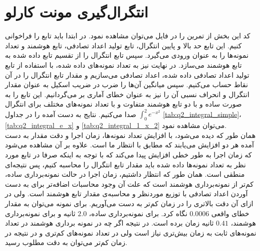 \documentclass[11pt, a4paper]{article}
\begin{document}
\section{\textbf{انتگرال‌گیری مونت کارلو}}
کد این بخش از تمرین را در فایل
می‌توان مشاهده نمود.
در ابتدا باید تابع
را فراخوانی کنیم.
این تابع حد بالا و پایین انتگرال، تابع تولید اعداد تصادفی،
تابع هوشمند و تعداد نمونه‌ها را به عنوان ورودی می‌گیرد.
سپس تابع انتگرال را از تقسیم تابع داده شده به تابع هوشمند می‌سازد.
در نهایت نیز به تعداد نمونه‌های داده شده، با استفاده از تابع تولید اعداد تصادفی داده شده، اعداد تصادفی می‌سازیم و
مقدار تابع انتگرال را در آن نقاط حساب می‌کنیم.
سپس میانگین آن‌ها را ضرب در ضریب اسکیل به عنوان مقدار انتگرال و انحراف نسبی آن را نیز به عنوان خطای آماری بر می‌گردانیم.
این تابع را به صورت ساده و با دو تابع هوشمند متفاوت و با تعداد نمونه‌های مختلف  برای انتگرال 
$\int_0^2 e^{-x^2}$
صدا می‌کنیم.
نتایج به دست آمده را در جداول
\ref{tab:q2_integral_simple}،
\ref{tab:q2_integral_e_x}
و
\ref{tab:q2_integral_1_x_2}
می‌توان مشاهده نمود.
\\
همان طور که دیده می‌شود،
با افزایش تعداد نمونه‌ها، زمان اجرا و دقت مقدار به دست آمده هر دو افزایش می‌یابند که مطابق با انتظار ما است.
علاوه بر آن مشاهده می‌شود که زمان اجرا به طور خطی افزایش پیدا می‌کند که با توجه به اینکه صرفا در تابع مورد نظر
به تعداد نمونه‌ها داده شده باید مقدار تابع انتگرال را محاسبه کنیم، پس نتیجه‌ای منطقی است.
همان طور که انتظار داشتیم، زمان اجرا در حالت نمونه‌برداری ساده، کم‌تر از نمونه‌برداری هوشمند است
که علت آن وجود محاسبات اضافه‌تر برای به دست آوردن اعداد تصادفی با توزیع مورد‌نظر و محاسبه‌ی مقدار تابع هوشمند است.
ولی در ازای آن دقت بالاتری را در زمان کم‌تر به دست می‌آوریم.
برای نمونه می‌توان به مقدار خطای واقعی
$0.0006$
نگاه کرد.
برای نمونه‌برداری ساده،
$2.0$
ثانیه و برای نمونه‌برداری هوشمند،
$0.41$
ثانیه زمان برده است.
در نتیجه اگر چه در نمونه برداری هوشمند در تعداد نمونه‌های ثابت به زمان بیش‌تری نیاز است
ولی در تعداد نمونه‌های کم‌تری و در نتیجه در زمان کم‌تر می‌توان به دقت مطلوب رسید.
\end{document}
